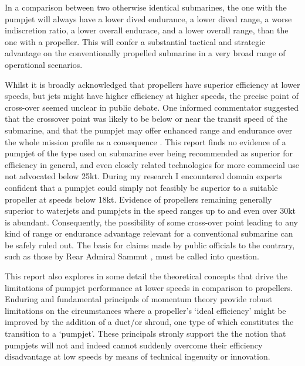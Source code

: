\documentclass{article}\usepackage[]{graphicx}\usepackage[]{color}
\begin{document}
\begin{tcolorbox}[width=0.8\textwidth, center, colback=blue!5!white,colframe=blue!75!black, title= The Conclusive Qualitative Comparison]
In a comparison between two otherwise identical submarines, the one with the pumpjet will always have a lower dived endurance, a lower dived range, a worse indiscretion ratio, a lower overall endurace, and a lower overall range, than the one with a propeller.  This will confer a substantial tactical and strategic advantage on the conventionally propelled submarine in a very broad range of operational scenarios.
\end{tcolorbox}

Whilst it is broadly acknowledged that propellers have superior efficiency at lower speeds, but jets might have higher efficiency at higher speeds, the precise point of cross-over seemed unclear in public debate.  One informed commentator suggested that the crossover point was likely to be below or near the transit speed of the submarine, and that the pumpjet may offer enhanced range and endurance over the whole mission profile as a consequence \parencite{davies2017}.  This report finds no evidence of a pumpjet of the type used on submarine ever being recommended as superior for efficiency in general, and even closely related technologies for more commecial use not advocated below 25kt. During my research I encountered domain experts confident that a pumpjet could simply not feasibly be superior to a suitable propeller at speeds below 18kt.  Evidence of propellers remaining generally superior to waterjets and pumpjets in the speed ranges up to and even over 30kt is abundant.  Consequently, the possibility of some cross-over point leading to any kind of range or endurance advantage relevant for a conventional submarine can be safely ruled out.  The basis for claims made by public officials to the contrary, such as those by Rear Admiral Sammut \parencite{sammut2017}, must be called into question.

This report also explores in some detail the theoretical concepts that drive the limitations of pumpjet performance at lower speeds in comparison to propellers.  Enduring and fundamental principals of momentum theory provide robust limitations on the circumstances where a propeller's `ideal efficiency' might be improved by the addition of a duct/or shroud, one type of which constitutes the transition to a `pumpjet'.  These principals stronly support the the notion that pumpjets will not and indeed cannot suddenly overcome their efficiency disadvantage at low speeds by means of technical ingenuity or innovation.
\end{document}
